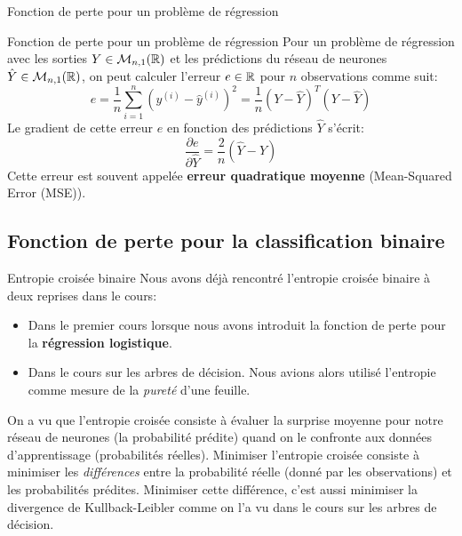 \begin{frame}{Fonction de perte pour un problème de régression}
	\begin{block}{Fonction de perte pour un problème de régression}
		Pour un problème de régression avec les sorties $Y \in \mathcal{M}_{n,1}(\mathbb{R})$ et les prédictions du réseau de neurones $\hat{Y} \in \mathcal{M}_{n,1}(\mathbb{R})$, on peut calculer l'erreur $e \in \mathbb{R}$ pour $n$ observations comme suit:
		\begin{equation*}
			e = \frac{1}{n} \sum_{i=1}^n \left(y^{(i)} - \hat{y}^{(i)}\right)^2 = \frac{1}{n} \left(Y - \hat{Y}\right)^T \left(Y - \hat{Y}\right)
		\end{equation*}
		Le gradient de cette erreur $e$ en fonction des prédictions $\hat{Y}$ s'écrit:
		\begin{equation*}
			\frac{\partial{e}}{\partial{\hat{Y}}} = \frac{2}{n} \left(\hat{Y} - Y\right)
		\end{equation*}
		Cette erreur est souvent appelée \textbf{erreur quadratique moyenne} (Mean-Squared Error (MSE)).
	\end{block}
\end{frame}

\subsection[Fonction de perte pour la classification binaire]{Fonction de perte pour la classification binaire}

\begin{frame}{Entropie croisée binaire}
	Nous avons déjà rencontré l'entropie croisée binaire à deux reprises dans le cours:
	\begin{itemize}
		\item Dans le premier cours lorsque nous avons introduit la fonction de perte pour la \textbf{régression logistique}.
		\item Dans le cours sur les arbres de décision. Nous avions alors utilisé l'entropie comme mesure de la \textit{pureté} d'une feuille.
	\end{itemize}
	\pause
	On a vu que l'entropie croisée consiste à évaluer la surprise moyenne pour notre réseau de neurones (la probabilité prédite) quand on le confronte aux données d'apprentissage (probabilités réelles). Minimiser l'entropie croisée consiste à minimiser les \textit{différences} entre la probabilité réelle (donné par les observations) et les probabilités prédites. Minimiser cette différence, c'est aussi minimiser la divergence de Kullback-Leibler comme on l'a vu dans le cours sur les arbres de décision.
\end{frame}

